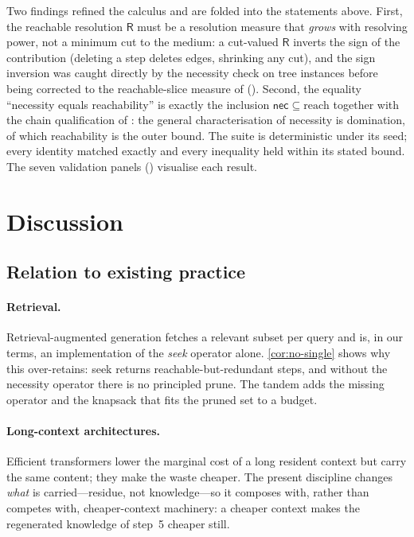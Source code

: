 \documentclass[11pt,twocolumn,a4paper]{article}
\theoremstyle{thmstyle}
\theoremstyle{definition}
\theoremstyle{remark}
\newcommand{\reach}{\mathrm{reach}}
\newcommand{\Res}{\mathsf{R}}           %
\newcommand{\nec}{\textsf{nec}}
\begin{document}
Two findings refined the calculus and are folded into the statements above.
First, the reachable resolution $\Res$ must be a resolution measure that
\emph{grows} with resolving power, not a minimum cut to the medium: a cut-valued
$\Res$ inverts the sign of the contribution (deleting a step deletes edges,
shrinking any cut), and the sign inversion was caught directly by the
necessity check on tree instances before being corrected to the reachable-slice
measure of  (). Second, the
equality ``necessity equals reachability'' is exactly the inclusion
$\nec\subseteq\reach$ together with the chain qualification of
: the general characterisation of necessity is
domination, of which reachability is the outer bound. The suite is deterministic
under its seed; every identity matched exactly and every inequality held within
its stated bound. The seven validation panels
()
visualise each result.



\section{Discussion}
\label{sec:discussion}

\subsection{Relation to existing practice}

\paragraph{Retrieval.} Retrieval-augmented generation \citep{lewis2020} fetches a
relevant subset per query and is, in our terms, an implementation of the
\emph{seek} operator alone. \cref{cor:no-single} shows why this over-retains: seek
returns reachable-but-redundant steps, and without the necessity operator there
is no principled prune. The tandem adds the missing operator and the knapsack
that fits the pruned set to a budget.

\paragraph{Long-context architectures.} Efficient transformers \citep{tay2022}
lower the marginal cost of a long resident context but carry the same content;
they make the waste cheaper. The present discipline changes \emph{what} is
carried---residue, not knowledge---so it composes with, rather than competes
with, cheaper-context machinery: a cheaper context makes the regenerated
knowledge of step~5 cheaper still.
\end{document}
